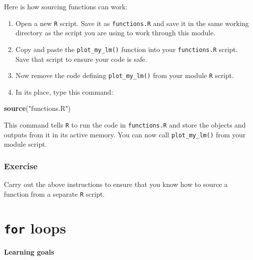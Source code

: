 \documentclass[
]{book}
\newenvironment{Shaded}{\begin{snugshade}}{\end{snugshade}}
\newcommand{\KeywordTok}[1]{\textcolor[rgb]{0.13,0.29,0.53}{\textbf{#1}}}
\newcommand{\NormalTok}[1]{#1}
\newcommand{\StringTok}[1]{\textcolor[rgb]{0.31,0.60,0.02}{#1}}
\begin{document}
Here is how sourcing functions can work:

\begin{enumerate}
\def\labelenumi{\arabic{enumi}.}
\item
  Open a new \texttt{R} script. Save it as \texttt{functions.R} and save it in the same working directory as the script you are using to work through this module.
\item
  Copy and paste the \texttt{plot\_my\_lm()} function into your \texttt{functions.R} script. Save that script to ensure your code is safe.
\item
  Now remove the code defining \texttt{plot\_my\_lm()} from your module \texttt{R} script.
\item
  In its place, type this command:
\end{enumerate}

\begin{Shaded}
\begin{Highlighting}[]
\KeywordTok{source}\NormalTok{(}\StringTok{"functions.R"}\NormalTok{)}
\end{Highlighting}
\end{Shaded}

This command tells \texttt{R} to run the code in \texttt{functions.R} and store the objects and outputs from it in its active memory. You can now call \texttt{plot\_my\_lm()} from your module script.

\hypertarget{exercise-4}{%
\subsection*{Exercise}\label{exercise-4}}

Carry out the above instructions to ensure that you know how to source a function from a separate \texttt{R} script.

\hypertarget{for-loops}{%
\chapter{\texorpdfstring{\texttt{for} loops}{for loops}}\label{for-loops}}

\hypertarget{learning-goals-24}{%
\subsubsection*{Learning goals}\label{learning-goals-24}}
\end{document}
